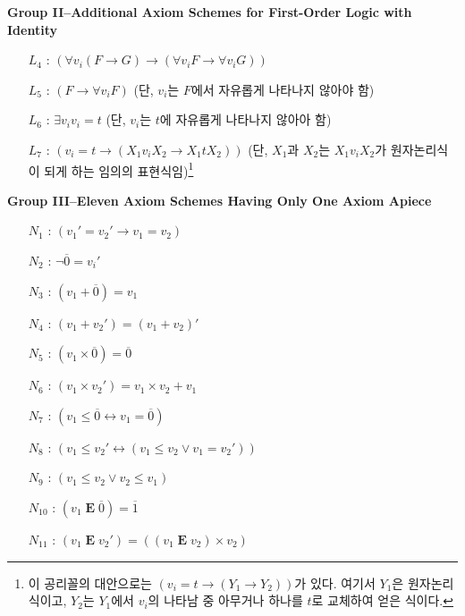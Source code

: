 \documentclass[12pt]{paper}
\begin{document}
\noindent \textbf{Group II--Additional Axiom Schemes for First-Order Logic with Identity}
\begin{enumerate}
\item[$L_{4}$ :] $\left( \forall v_i \left( F \rightarrow G \right) \rightarrow \left( \forall v_i F \rightarrow \forall v_i G \right) \right)$
\item[$L_{5}$ :] $\left( F \rightarrow \forall v_i F \right)$ (단, $v_i$는 $F$에서 자유롭게 나타나지 않아야 함)
\item[$L_{6}$ :] $\exists v_i v_i = t$ (단, $v_i$는 $t$에 자유롭게 나타나지 않아아 함)
\item[$L_{7}$ :] $\left( v_i = t \rightarrow \left( X_1 v_i X_2 \rightarrow X_1 t X_2 \right) \right)$ (단, $X_1$과 $X_2$는 $X_1 v_i X_2$가 원자논리식이 되게 하는 임의의 표현식임)\footnote
{
이 공리꼴의 대안으로는 $\left( v_i = t \rightarrow \left( Y_1 \rightarrow Y_2 \right) \right)$가 있다.
여기서 $Y_1$은 원자논리식이고, $Y_2$는 $Y_1$에서 $v_i$의 나타남 중 아무거나 하나를 $t$로 교체하여 얻은 식이다.
}
\end{enumerate}

\noindent \textbf{Group III--Eleven Axiom Schemes Having Only One Axiom Apiece}
\begin{enumerate}
\item[$N_{1}$ :] $\left( v_1 ' = v_2 ' \rightarrow v_1 = v_2 \right)$
\item[$N_{2}$ :] $\lnot \overline{0} = v_i '$
\item[$N_{3}$ :] $\left( v_1 + \overline{0} \right) = v_1$
\item[$N_{4}$ :] $\left( v_1 + v_2 ' \right) = \left( v_1 + v_2 \right) '$
\item[$N_{5}$ :] $\left( v_1 \times \overline{0} \right) = \overline{0}$
\item[$N_{6}$ :] $\left( v_1 \times v_2 ' \right) = v_1 \times v_2 + v_1$
\item[$N_{7}$ :] $\left( v_1 \leq \overline{0} \leftrightarrow v_1 = \overline{0} \right)$
\item[$N_{8}$ :] $\left( v_1 \leq v_2 ' \leftrightarrow \left( v_1 \leq v_2 \lor v_1 = v_2 ' \right) \right)$
\item[$N_{9}$ :] $\left( v_1 \leq v_2 \lor v_2 \leq v_1 \right)$
\item[$N_{10}$ :] $\left( v_1 \mathop{\mathbf{E}} \overline{0} \right) = \overline{1}$
\item[$N_{11}$ :] $\left( v_1 \mathop{\mathbf{E}} v_2 ' \right) = \left( \left( v_1 \mathop{\mathbf{E}} v_2 \right) \times v_2 \right)$ 
\end{enumerate}
\end{document}
